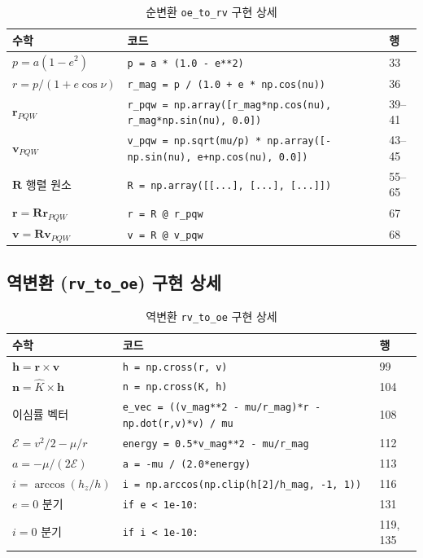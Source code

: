 \documentclass[11pt]{article}
\begin{document}
\begin{table}[h]
\centering
\begin{tabular}{lll}
\toprule
수학 & 코드 & 행 \\
\midrule
$p = a(1-e^2)$ & \texttt{p = a * (1.0 - e**2)} & 33 \\
$r = p/(1+e\cos\nu)$ & \texttt{r\_mag = p / (1.0 + e * np.cos(nu))} & 36 \\
$\mathbf{r}_{PQW}$ & \texttt{r\_pqw = np.array([r\_mag*np.cos(nu), r\_mag*np.sin(nu), 0.0])} & 39--41 \\
$\mathbf{v}_{PQW}$ & \texttt{v\_pqw = np.sqrt(mu/p) * np.array([-np.sin(nu), e+np.cos(nu), 0.0])} & 43--45 \\
$\mathbf{R}$ 행렬 원소 & \texttt{R = np.array([[...], [...], [...]])} & 55--65 \\
$\mathbf{r} = \mathbf{R}\mathbf{r}_{PQW}$ & \texttt{r = R @ r\_pqw} & 67 \\
$\mathbf{v} = \mathbf{R}\mathbf{v}_{PQW}$ & \texttt{v = R @ v\_pqw} & 68 \\
\bottomrule
\end{tabular}
\caption{순변환 \texttt{oe\_to\_rv} 구현 상세}
\label{tab:forward_impl}
\end{table}

\subsection{역변환 (\texttt{rv\_to\_oe}) 구현 상세}

\begin{table}[h]
\centering
\begin{tabular}{lll}
\toprule
수학 & 코드 & 행 \\
\midrule
$\mathbf{h} = \mathbf{r} \times \mathbf{v}$ & \texttt{h = np.cross(r, v)} & 99 \\
$\mathbf{n} = \hat{K} \times \mathbf{h}$ & \texttt{n = np.cross(K, h)} & 104 \\
이심률 벡터 & \texttt{e\_vec = ((v\_mag**2 - mu/r\_mag)*r - np.dot(r,v)*v) / mu} & 108 \\
$\mathcal{E} = v^2/2 - \mu/r$ & \texttt{energy = 0.5*v\_mag**2 - mu/r\_mag} & 112 \\
$a = -\mu/(2\mathcal{E})$ & \texttt{a = -mu / (2.0*energy)} & 113 \\
$i = \arccos(h_z/h)$ & \texttt{i = np.arccos(np.clip(h[2]/h\_mag, -1, 1))} & 116 \\
$e=0$ 분기 & \texttt{if e < 1e-10:} & 131 \\
$i=0$ 분기 & \texttt{if i < 1e-10:} & 119, 135 \\
\bottomrule
\end{tabular}
\caption{역변환 \texttt{rv\_to\_oe} 구현 상세}
\label{tab:inverse_impl}
\end{table}
\end{document}
